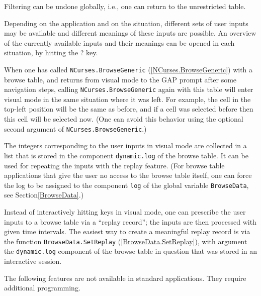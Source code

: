 \documentclass[a4paper,11pt]{report}
\begin{document}
{{\begin{description}
 Filtering can be undone globally, i.{\nobreakspace}e., one can return to the
unrestricted table. 
\item[{Help:\index{help window for a browse table}}]  Depending on the application and on the situation, different sets of user
inputs may be available and different meanings of these inputs are possible.
An overview of the currently available inputs and their meanings can be opened
in each situation, by hitting the \textsc{?} key. 
\item[{Re-entering:}]  When one has called \texttt{NCurses.BrowseGeneric} (\ref{NCurses.BrowseGeneric}) with a browse table, and returns from visual mode to the \textsf{GAP} prompt after some navigation steps, calling \texttt{NCurses.BrowseGeneric} again with this table will enter visual mode in the same situation where it
was left. For example, the cell in the top-left position will be the same as
before, and if a cell was selected before then this cell will be selected now.
(One can avoid this behavior using the optional second argument of \texttt{NCurses.BrowseGeneric}.) 
\item[{Logging:\index{log of a browse table session}}]  The integers corresponding to the user inputs in visual mode are collected in
a list that is stored in the component \texttt{dynamic.log} of the browse table. It can be used for repeating the inputs with the replay
feature. (For browse table applications that give the user no access to the
browse table itself, one can force the log to be assigned to the component \texttt{log} of the global variable \texttt{BrowseData},  see Section{\nobreakspace}\ref{BrowseData}.) 
\item[{Replay:\index{replay of a browse table session}}]  Instead of interactively hitting keys in visual mode, one can prescribe the
user inputs to a browse table via a ``replay record''; the inputs are then processed with given time intervals. The easiest way to
create a meaningful replay record is via the function \texttt{BrowseData.SetReplay} (\ref{BrowseData.SetReplay}), with argument the \texttt{dynamic.log} component of the browse table in question that was stored in an interactive
session. 
\end{description}
 

 The following features are not available in standard applications. They
require additional programming. 

}}
\end{document}
